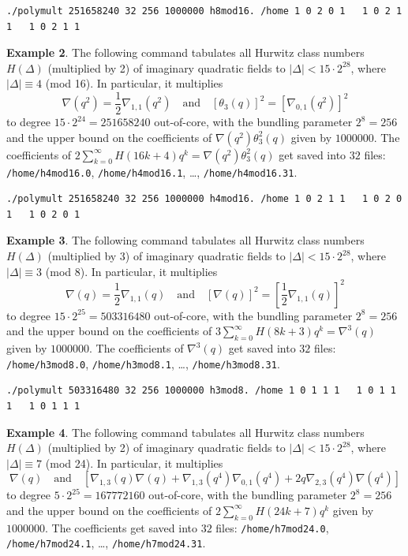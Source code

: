 \documentclass[a4paper,10pt]{article}
\newcommand{\code}{\lstinline}
\begin{document}
\begin{verbatim}
./polymult 251658240 32 256 1000000 h8mod16. /home 1 0 2 0 1   1 0 2 1 1   1 0 2 1 1
\end{verbatim}

\textbf{Example 2}. The following command tabulates all Hurwitz class numbers $H(\Delta)$ (multiplied by 2) of imaginary quadratic fields to $|\Delta| < 15 \cdot 2^{28}$, where $|\Delta| \equiv 4$ (mod 16). In particular, it multiplies
%
$$
\nabla(q^2) = \frac{1}{2}\nabla_{1, 1}(q^2) \quad \text{and} \quad \left[\theta_3(q)\right]^2 = \left[\nabla_{0, 1}(q^2)\right]^2
$$
%
to degree $15 \cdot 2^{24} = 251658240$ out-of-core, with the bundling parameter $2^8=256$ and the upper bound on the coefficients of $\nabla(q^2)\theta_3^2(q)$ given by $1000000$. The coefficients of $2\sum_{k = 0}^\infty H(16k + 4)q^k = \nabla(q^2)\theta_3^2(q)$ get saved into $32$ files: \code{/home/h4mod16.0}, \code{/home/h4mod16.1}, \ldots, \code{/home/h4mod16.31}.

\begin{verbatim}
./polymult 251658240 32 256 1000000 h4mod16. /home 1 0 2 1 1   1 0 2 0 1   1 0 2 0 1
\end{verbatim}

\textbf{Example 3}. The following command tabulates all Hurwitz class numbers $H(\Delta)$ (multiplied by 3) of imaginary quadratic fields to $|\Delta| < 15 \cdot 2^{28}$, where $|\Delta| \equiv 3$ (mod 8). In particular, it multiplies
%
$$
\nabla(q) = \frac{1}{2}\nabla_{1, 1}(q) \quad \text{and} \quad \left[\nabla(q)\right]^2 = \left[\frac{1}{2}\nabla_{1, 1}(q)\right]^2
$$
%
to degree $15 \cdot 2^{25} = 503316480$ out-of-core, with the bundling parameter $2^8=256$ and the upper bound on the coefficients of $3\sum_{k = 0}^\infty H(8k + 3)q^k = \nabla^3(q)$ given by $1000000$. The coefficients of $\nabla^3(q)$ get saved into $32$ files: \code{/home/h3mod8.0}, \code{/home/h3mod8.1}, \ldots, \code{/home/h3mod8.31}.

\begin{verbatim}
./polymult 503316480 32 256 1000000 h3mod8. /home 1 0 1 1 1   1 0 1 1 1   1 0 1 1 1
\end{verbatim}

\textbf{Example 4}. The following command tabulates all Hurwitz class numbers $H(\Delta)$ (multiplied by 2) of imaginary quadratic fields to $|\Delta| < 15 \cdot 2^{28}$, where $|\Delta| \equiv 7$ (mod 24). In particular, it multiplies
%
$$
\nabla(q) \quad \text{and} \quad \left[\nabla_{1,3}(q)\nabla(q) + \nabla_{1,3}(q^4)\nabla_{0, 1}(q^4) + 2q\nabla_{2,3}(q^4)\nabla(q^4)\right]
$$
%
to degree $5 \cdot 2^{25} = 167772160$ out-of-core, with the bundling parameter $2^8=256$ and the upper bound on the coefficients of $2\sum_{k = 0}^{\infty}H(24k + 7)q^k$ given by $1000000$. The coefficients get saved into $32$ files: \code{/home/h7mod24.0}, \code{/home/h7mod24.1}, \ldots, \code{/home/h7mod24.31}.
\end{document}
